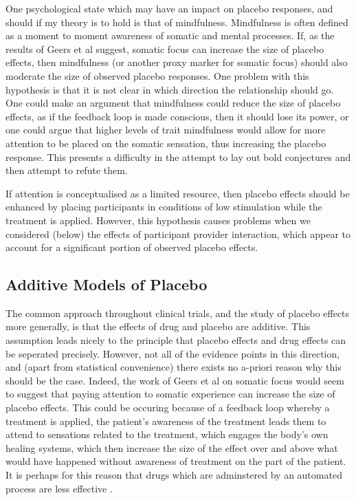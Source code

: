 One psychological state which may have an impact on placebo responses, and should if my theory is to hold is that of mindfulness. Mindfulness is often defined as a moment to moment awareness of somatic and mental processes. If, as the results of Geers et al suggest, somatic focus can increase the size of placebo effects, then mindfulness (or another proxy marker for somatic focus) should also moderate the size of observed placebo responses. One problem with this hypothesis is that it is not clear in which direction the relationship should go. One could make an argument that mindfulness could reduce the size of placebo effects, as if the feedback loop is made conscious, then it should lose its power, or one could argue that higher levels of trait mindfulness would allow for more attention to be placed on the somatic sensation, thus increasing the placebo response. This presents a difficulty in the attempt to lay out bold conjectures and then attempt to refute them. 

If attention is conceptualised as a limited resource, then placebo effects should be enhanced by placing participants in conditions of low stimulation while the treatment is applied. However, this hypothesis causes problems when we considered (below) the effects of participant provider interaction, which appear to account for a significant portion of observed placebo effects. 

\subsection{Additive Models of Placebo}

The common approach throughout clinical trials, and the study of placebo effects more generally, is that the effects of drug and placebo are additive. This assumption leads nicely to the principle that placebo effects and drug effects can be seperated precisely. However, not all of the evidence points in this direction, and (apart from statistical convenience) there exists no a-priori reason why this should be the case. Indeed, the work of Geers et al on somatic focus would seem to suggest that paying attention to somatic experience can increase the size of placebo effects. This could be occuring because of a feedback loop whereby a treatment is applied, the patient's awareness of the treatment leads them to attend to sensations related to the treatment, which engages the body's own healing systems, which then increase the size of the effect over and above what would have happened without awareness of treatment on the part of the patient. It is perhaps for this reason that drugs which are adminstered by an automated process are less effective \cite{Benedetti2003}. 

